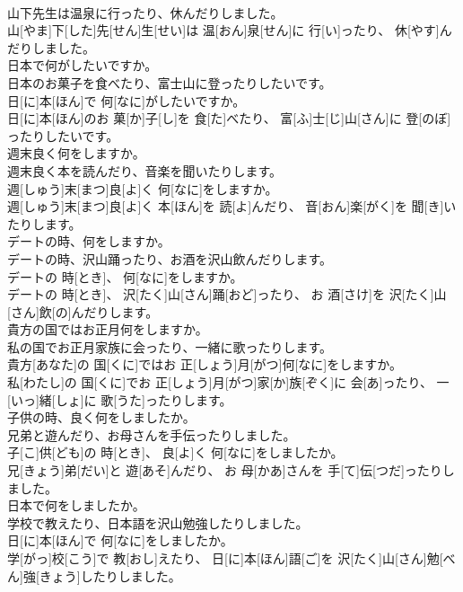 \documentclass[8pt]{extreport}
\begin{document}
\begin{CJK}{UTF8}{min}
\\	山下先生は温泉に行ったり、休んだりしました。	
\\	山[やま]下[した]先[せん]生[せい]は 温[おん]泉[せん]に 行[い]ったり、 休[やす]んだりしました。
\\	日本で何がしたいですか。 
\\	日本のお菓子を食べたり、富士山に登ったりしたいです。	
\\	日[に]本[ほん]で 何[なに]がしたいですか。 
\\	日[に]本[ほん]のお 菓[か]子[し]を 食[た]べたり、 富[ふ]士[じ]山[さん]に 登[のぼ]ったりしたいです。
\\	週末良く何をしますか。 
\\	週末良く本を読んだり、音楽を聞いたりします。	
\\	週[しゅう]末[まつ]良[よ]く 何[なに]をしますか。 
\\	週[しゅう]末[まつ]良[よ]く 本[ほん]を 読[よ]んだり、 音[おん]楽[がく]を 聞[き]いたりします。
\\	デートの時、何をしますか。 
\\	デートの時、沢山踊ったり、お酒を沢山飲んだりします。	
\\	デートの 時[とき]、 何[なに]をしますか。 
\\	デートの 時[とき]、 沢[たく]山[さん]踊[おど]ったり、 お 酒[さけ]を 沢[たく]山[さん]飲[の]んだりします。
\\	貴方の国ではお正月何をしますか。 
\\	私の国でお正月家族に会ったり、一緒に歌ったりします。	
\\	貴方[あなた]の 国[くに]ではお 正[しょう]月[がつ]何[なに]をしますか。 
\\	私[わたし]の 国[くに]でお 正[しょう]月[がつ]家[か]族[ぞく]に 会[あ]ったり、 一[いっ]緒[しょ]に 歌[うた]ったりします。
\\	子供の時、良く何をしましたか。 
\\	兄弟と遊んだり、お母さんを手伝ったりしました。	
\\	子[こ]供[ども]の 時[とき]、 良[よ]く 何[なに]をしましたか。 
\\	兄[きょう]弟[だい]と 遊[あそ]んだり、 お 母[かあ]さんを 手[て]伝[つだ]ったりしました。
\\	日本で何をしましたか。 
\\	学校で教えたり、日本語を沢山勉強したりしました。	
\\	日[に]本[ほん]で 何[なに]をしましたか。 
\\	学[がっ]校[こう]で 教[おし]えたり、 日[に]本[ほん]語[ご]を 沢[たく]山[さん]勉[べん]強[きょう]したりしました。

\end{CJK}
\end{document}
